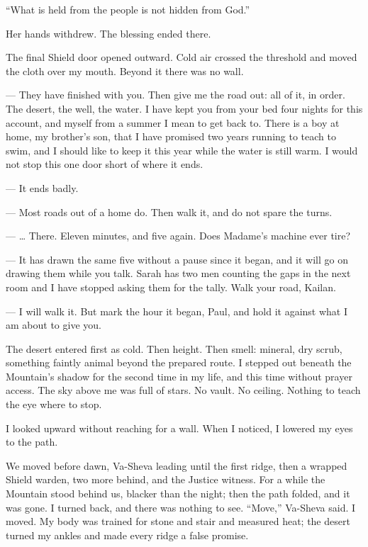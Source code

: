 ``What is held from the people is not hidden from God.''\par

Her hands withdrew. The blessing ended there.\par

The final Shield door opened outward. Cold air crossed the threshold and moved the cloth over my mouth. Beyond it there was no wall.\par

\ornament

\begin{room}

--- They have finished with you. Then give me the road out: all of it, in order. The desert, the well, the water. I have kept you from your bed four nights for this account, and myself from a summer I mean to get back to. There is a boy at home, my brother's son, that I have promised two years running to teach to swim, and I should like to keep it this year while the water is still warm. I would not stop this one door short of where it ends.

--- It ends badly.

--- Most roads out of a home do. Then walk it, and do not spare the turns.

--- \ldots{} There. Eleven minutes, and five again. Does Madame's machine ever tire?

--- It has drawn the same five without a pause since it began, and it will go on drawing them while you talk. Sarah has two men counting the gaps in the next room and I have stopped asking them for the tally. Walk your road, Kailan.

--- I will walk it. But mark the hour it began, Paul, and hold it against what I am about to give you.

\end{room}

\ornament

The desert entered first as cold. Then height. Then smell: mineral, dry scrub, something faintly animal beyond the prepared route. I stepped out beneath the Mountain's shadow for the second time in my life, and this time without prayer access. The sky above me was full of stars. No vault. No ceiling. Nothing to teach the eye where to stop.\par

I looked upward without reaching for a wall. When I noticed, I lowered my eyes to the path.\par

We moved before dawn, Va-Sheva leading until the first ridge, then a wrapped Shield warden, two more behind, and the Justice witness. For a while the Mountain stood behind us, blacker than the night; then the path folded, and it was gone. I turned back, and there was nothing to see. ``Move,'' Va-Sheva said. I moved. My body was trained for stone and stair and measured heat; the desert turned my ankles and made every ridge a false promise.\par


